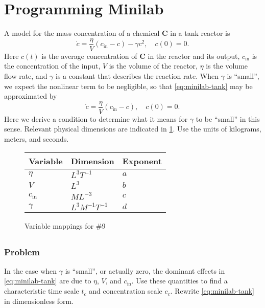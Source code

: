 \documentclass[12pt]{article}
\begin{document}
\section{Programming Minilab}
A model for the mass concentration of a chemical \textbf{C} in a tank reactor is
\begin{equation}
  \label{eq:minilab-tank}
  \dot{c} = \frac{\eta}{V}(c_{\text{in}}-c)-\gamma c^2,\quad c(0)=0.
\end{equation}
Here $c(t)$ is the average concentration of \textbf{C} in the reactor and its
output, $c_{\text{in}}$ is the concentration of the input, $V$ is the volume of
the reactor, $\eta$ is the volume flow rate, and $\gamma$ is a constant that
describes the reaction rate. When $\gamma$ is ``small'', we expect the nonlinear
term to be negligible, so that \cref{eq:minilab-tank} may be approximated by
\begin{equation}
  \label{eq:minilab-tank-approx}
  \dot{c} = \frac{\eta}{V}(c_{\text{in}}-c),\quad c(0)=0.
\end{equation}
Here we derive a condition to determine what it means for $\gamma$ to be
``small'' in this sense. Relevant physical dimensions are indicated in
\cref{fig:minilab-var-mappings}. Use the units of kilograms, meters, and
seconds.

\begin{figure}
  \centering
  \begin{tabularx}{0.5\textwidth}{XXX}
    Variable & Dimension & Exponent \\ \hline
    $\eta$ & $L^3T^{-1}$ & $a$ \\
    $V$ & $L^3$ & $b$ \\
    $c_{\text{in}}$ & $ML^{-3}$ & $c$ \\
    $\gamma$ & $L^3M^{-1}T^{-1}$ & $d$ \\
  \end{tabularx}
  \caption{Variable mappings for \#9}
  \label{fig:minilab-var-mappings}
\end{figure}

\subsection{}
\label{sec:minilab-first-problem}
\subsubsection*{Problem}
In the case when $\gamma$ is ``small'', or actually zero, the dominant effects
in \cref{eq:minilab-tank} are due to $\eta$, $V$, and $c_{\text{in}}$. Use these
quantities to find a characteristic time scale $t_c$ and concentration scale
$c_c$. Rewrite \cref{eq:minilab-tank} in dimensionless form.
\end{document}
